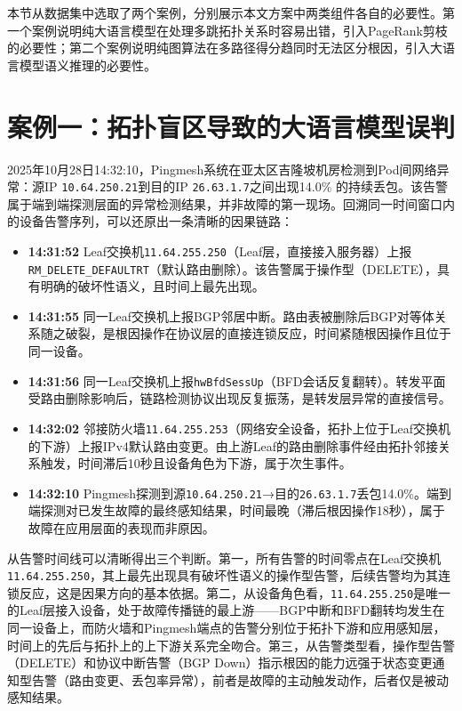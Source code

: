 本节从数据集中选取了两个案例，分别展示本文方案中两类组件各自的必要性。第一个案例说明纯大语言模型在处理多跳拓扑关系时容易出错，引入PageRank剪枝的必要性；第二个案例说明纯图算法在多路径得分趋同时无法区分根因，引入大语言模型语义推理的必要性。

\section{案例一：拓扑盲区导致的大语言模型误判}

2025年10月28日14:32:10，Pingmesh系统在亚太区吉隆坡机房检测到Pod间网络异常：源IP \texttt{10.64.250.21}到目的IP \texttt{26.63.1.7}之间出现14.0\% 的持续丢包。该告警属于端到端探测层面的异常检测结果，并非故障的第一现场。回溯同一时间窗口内的设备告警序列，可以还原出一条清晰的因果链路：

\begin{itemize}
    \item \textbf{14:31:52} \quad Leaf交换机\texttt{11.64.255.250}（Leaf层，直接接入服务器）上报\texttt{RM\_DELETE\_DEFAULTRT}（默认路由删除）。该告警属于操作型（DELETE），具有明确的破坏性语义，且时间上最先出现。
    \item \textbf{14:31:55} \quad 同一Leaf交换机上报BGP邻居中断。路由表被删除后BGP对等体关系随之破裂，是根因操作在协议层的直接连锁反应，时间紧随根因操作且位于同一设备。
    \item \textbf{14:31:56} \quad 同一Leaf交换机上报\texttt{hwBfdSessUp}（BFD会话反复翻转）。转发平面受路由删除影响后，链路检测协议出现反复振荡，是转发层异常的直接信号。
    \item \textbf{14:32:02} \quad 邻接防火墙\texttt{11.64.255.253}（网络安全设备，拓扑上位于Leaf交换机的下游）上报IPv4默认路由变更。由上游Leaf的路由删除事件经由拓扑邻接关系触发，时间滞后10秒且设备角色为下游，属于次生事件。
    \item \textbf{14:32:10} \quad Pingmesh探测到源\texttt{10.64.250.21}→目的\texttt{26.63.1.7}丢包14.0\%。端到端探测对已发生故障的最终感知结果，时间最晚（滞后根因操作18秒），属于故障在应用层面的表现而非原因。
\end{itemize}

从告警时间线可以清晰得出三个判断。第一，所有告警的时间零点在Leaf交换机\texttt{11.64.255.250}，其上最先出现具有破坏性语义的操作型告警，后续告警均为其连锁反应，这是因果方向的基本依据。第二，从设备角色看，\texttt{11.64.255.250}是唯一的Leaf层接入设备，处于故障传播链的最上游——BGP中断和BFD翻转均发生在同一设备上，而防火墙和Pingmesh端点的告警分别位于拓扑下游和应用感知层，时间上的先后与拓扑上的上下游关系完全吻合。第三，从告警类型看，操作型告警（DELETE）和协议中断告警（BGP Down）指示根因的能力远强于状态变更通知型告警（路由变更、丢包率异常），前者是故障的主动触发动作，后者仅是被动感知结果。

